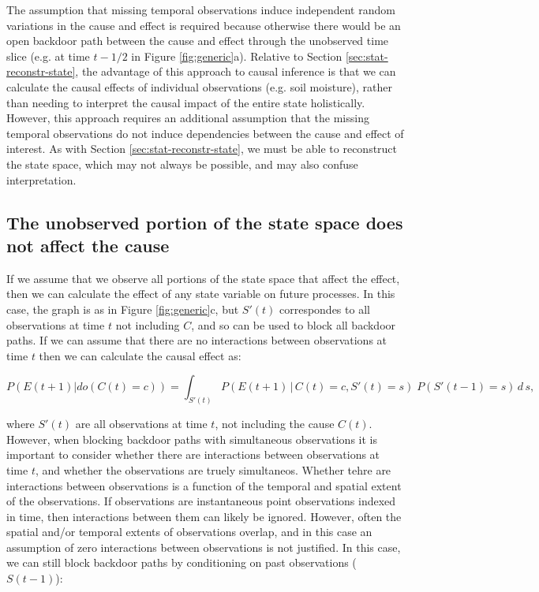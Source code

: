 \documentclass[12pt]{article}
\begin{document}
The assumption that missing temporal observations induce independent
random variations in the cause and effect is required because
otherwise there would be an open backdoor path between the cause and
effect through the unobserved time slice (e.g. at time $t-1/2$ in
Figure \ref{fig:generic}a). Relative to Section
\ref{sec:stat-reconstr-state}, the advantage of this approach to
causal inference is that we can calculate the causal effects of
individual observations (e.g. soil moisture), rather than needing to
interpret the causal impact of the entire state holistically. However,
this approach requires an additional assumption that the missing
temporal observations do not induce dependencies between the cause and
effect of interest. As with Section \ref{sec:stat-reconstr-state}, we
must be able to reconstruct the state space, which may not always be
possible, and may also confuse interpretation.


\subsection{The unobserved portion of the state space does not affect
  the cause}
\label{sec:observ-port-state}

If we assume that we observe all portions of the state space that
affect the effect, then we can calculate the effect of any state
variable on future processes. In this case, the graph is as in Figure
\ref{fig:generic}c, but $S'(t)$ correspondes to all observations at
time $t$ not including $C$, and so can be used to block all backdoor
paths. If we can assume that there are no interactions between
observations at time $t$ then we can calculate the causal effect as:

\begin{equation}
  P(E(t+1)| do(C(t)=c)) = \int_{S'(t)} P(E(t+1) \, | \, C(t)=c,
  S'(t) = s
  )\; P(S'(t-1)=s) \, d \, s,
\end{equation}

where $S'(t)$ are all observations at time $t$, not including the
cause $C(t)$. However, when blocking backdoor paths with simultaneous
observations it is important to consider whether there are
interactions between observations at time $t$, and whether the
observations are truely simultaneos. Whether tehre are interactions
between observations is a function of the temporal and spatial extent
of the observations. If observations are instantaneous point
observations indexed in time, then interactions between them can
likely be ignored. However, often the spatial and/or temporal extents
of observations overlap, and in this case an assumption of zero
interactions between observations is not justified. In this case, we
can still block backdoor paths by conditioning on past observations
($S(t-1)$):
\end{document}
